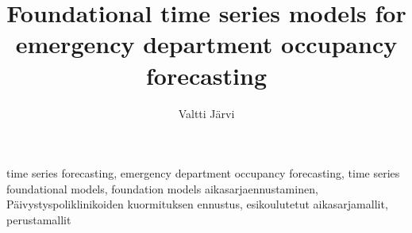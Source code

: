 \documentclass[english, ieee]{tauthesis}
\begin{document}

\frontmatter



\title{Foundational time series models for emergency department occupancy forecasting}{}

\author{Valtti Järvi}





\keywords%
    {time series forecasting, emergency department occupancy forecasting, time series foundational models, foundation models}
    {aikasarjaennustaminen, Päivystyspoliklinikoiden kuormituksen ennustus, esikoulutetut aikasarjamallit, perustamallit}

\maketitle


\end{document}
